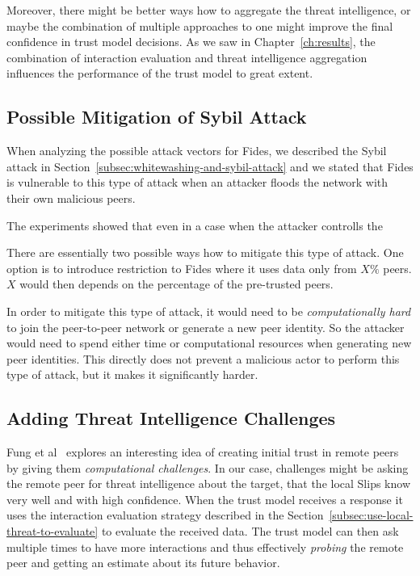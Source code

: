 Moreover, there might be better ways how to aggregate the threat intelligence, or maybe the combination of multiple approaches to one might improve the final confidence in trust model decisions.
As we saw in Chapter~\ref{ch:results}, the combination of interaction evaluation and threat intelligence aggregation influences the performance of the trust model to great extent.

\subsection{Possible Mitigation of Sybil Attack}
\label{subsec:possible-mittigation-of-sybil-attack}
When analyzing the possible attack vectors for Fides, we described the Sybil attack in Section~\ref{subsec:whitewashing-and-sybil-attack} and we stated that Fides is vulnerable to this type of attack when an attacker floods the network with their own malicious peers.

The experiments showed that even in a case when the attacker controlls the 

There are essentially two possible ways how to mitigate this type of attack.
One option is to introduce restriction to Fides where it uses data only from  $X\%$ peers. $X$ would then depends on the percentage of the pre-trusted peers. 

In order to mitigate this type of attack, it would need to be \textit{computationally hard} to join the peer-to-peer network or generate a new peer identity.
So the attacker would need to spend either time or computational resources when generating new peer identities.
This directly does not prevent a malicious actor to perform this type of attack, but it makes it significantly harder.

\subsection{Adding Threat Intelligence Challenges}
\label{subsec:adding-threat-intelligence-challenges}
Fung et al~\cite{fung2008trust} explores an interesting idea of creating initial trust in remote peers by giving them \textit{computational challenges}.
In our case, challenges might be asking the remote peer for threat intelligence about the target, that the local Slips know very well and with high confidence.
When the trust model receives a response it uses the interaction evaluation strategy described in the Section~\ref{subsec:use-local-threat-to-evaluate} to evaluate the received data.
The trust model can then ask multiple times to have more interactions and thus effectively \textit{probing} the remote peer and getting an estimate about its future behavior.

